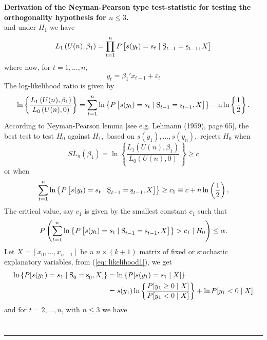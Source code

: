 \documentclass[harvard,11pt]{article}
\newenvironment{proof}[1][Proof]{\textbf{#1.} }{\  \rule{0.5em}{0.5em}}
\begin{document}
\begin{proof}[Derivation of the Neyman-Pearson type test-statistic for testing the orthogonality hypothesis for $n\leq 3$]
\begin{equation*}
\end{equation*}%
and under $H_1$ we have%
\begin{equation*}
L_1\left( U(n),\beta _{1}\right) =\prod\limits_{t=1}^{n}%
P\left[ s(y_{t})=s_{t}\mid \text{\b{S}}_{t-1}=\text{\b{s}}_{t-1}, X\right]
\end{equation*}%
where now, for $t=1,...,n,$%
\begin{equation*}
y_{t}=\beta_1'x_{t-1}+\varepsilon_{t}
\end{equation*}%
The log-likelihood ratio is given by%
\begin{equation*}
\ln \left\{ \frac{L_1\left( U(n),\beta _{1}\right) }{L
_{0}\left( U(n),0\right) }\right\} =\sum\limits_{t=1}^{n}\ln \left\{
P\left[ s(y_{t})=s_{t}\mid \text{\b{S}}_{t-1}=\text{\b{s}}_{t-1},X\right] \right\} -\text{n}\ln
\left\{ \frac{1}{2}\right\} .
\end{equation*}%
According to Neyman-Pearson lemma [see e.g. Lehmann (1959), page 65], the
best test to test $H_{0}$ against $H_1,$ based on $s(y_{1}),...,s(y_{n}),$
rejects $H_{0}$ when%
\begin{equation*}
SL_n(\beta_1)=\ln \left\{ \frac{L_1\left( U(n),\beta _{1}\right) }{L_{0}\left( U(n),0\right) }\right\} \geq c
\end{equation*}%
or when%
\begin{equation*}
\sum\limits_{t=1}^{n}\ln \left\{ P\left[ s(y_{t})=s_{t}\mid \text{%
\b{S}}_{t-1}=\text{%
\b{s}}_{t-1},X\right] \right\} \geq c_1\equiv c+n\ln\left(\frac{1}{2}\right),
\end{equation*}%
The critical value, say $c_1$ is given by the smallest constant $c_1$ such that%
\begin{equation*}
P\left(\sum\limits_{t=1}^{n}\ln \left\{ P\left[ s(y_{t})=s_{t}\mid \text{%
\b{S}}_{t-1}=\text{%
\b{s}}_{t-1},X\right] \right\} >c_1\mid
H_{0}\right) \leq \alpha .
\end{equation*}
Let $X=[x_0,...,x_{n-1}]$ be a $n\times (k+1)$ matrix of fixed or stochastic explanatory variables, from (\ref{eq: likelihood1}), we get
\begingroup
\allowdisplaybreaks
\begin{align*}
\ln\left\{P[s(y_1)=s_1\mid \text{\b{S}}_{0}=\text{\b{s}}_{0},X]\right\}&=\ln\left\{P[s(y_1)=s_1\mid X]\right\}\\
&=s(y_1)\ln \left\{\frac{P[y_1\geq 0\mid X]}{P[y_1< 0\mid X]}\right\}+ \ln P[y_1< 0\mid X]
\end{align*}
\endgroup
and for $t=2,...,n$, with $n\leq3$ we have
\begingroup
\allowdisplaybreaks
\begin{align*}

\end{align*}
\end{proof}
\end{document}
